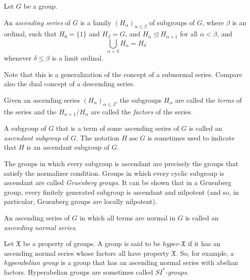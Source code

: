 \documentclass[12pt]{article}
\def\normal{\trianglelefteq}
\def\asc{\operatorname{asc}}
\begin{document}

Let $G$ be a group.

An \emph{ascending series} of $G$
is a family $(H_\alpha)_{\alpha\le\beta}$ of subgroups of $G$,
where $\beta$ is an ordinal,
such that $H_0=\{1\}$ and $H_\beta=G$,
and $H_\alpha\normal H_{\alpha+1}$ for all $\alpha<\beta$,
and $$\bigcup_{\alpha<\delta}H_\alpha=H_\delta$$
whenever $\delta\le\beta$ is a limit ordinal.

Note that this is a generalization of the concept of a subnormal series.
Compare also the dual concept of a descending series.

Given an ascending series $(H_\alpha)_{\alpha\le\beta}$,
the subgroups $H_\alpha$ are called the \emph{terms} of the series
and the  $H_{\alpha+1}/H_\alpha$
are called the \emph{factors} of the series.

A subgroup of $G$ that is a term of some ascending series of $G$
is called an \emph{ascendant subgroup} of $G$.
The notation $H\asc G$ is sometimes used
to indicate that $H$ is an ascendant subgroup of $G$.

The groups in which every subgroup is ascendant
are precisely the groups that satisfy the normalizer condition.
Groups in which every cyclic subgroup is ascendant
are called \emph{Gruenberg groups}.
It can be shown that in a Gruenberg group,
every finitely generated subgroup is ascendant and nilpotent
(and so, in particular, Gruenberg groups are locally nilpotent).

An ascending series of $G$
in which all terms are normal in $G$
is called an \emph{ascending normal series}.

Let $\mathfrak{X}$ be a property of groups.
A group is said to be \emph{hyper-$\mathfrak{X}$}
if it has an ascending normal series
whose factors all have property $\mathfrak{X}$.
So, for example, a \emph{hyperabelian group}
is a group that has an ascending normal series with abelian factors.
Hyperabelian groups are sometimes called \emph{$SI^*$-groups}.
\end{document}
